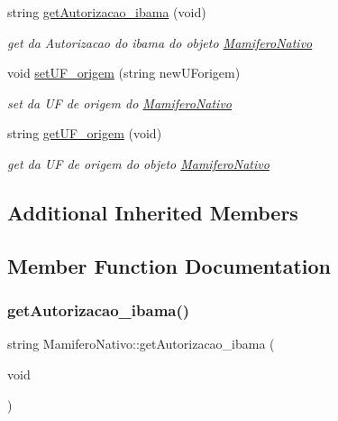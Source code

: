 \begin{DoxyCompactItemize}
string \mbox{\hyperlink{class_mamifero_nativo_a05e4212ad010052b947debc38a989d4e}{get\+Autorizacao\+\_\+ibama}} (void)
\begin{DoxyCompactList}\small\item\em get da Autorizacao do ibama do objeto \mbox{\hyperlink{class_mamifero_nativo}{Mamifero\+Nativo}} \end{DoxyCompactList}\item 
void \mbox{\hyperlink{class_mamifero_nativo_a33dab8f22dca500fa70ac3ed1be287c5}{set\+U\+F\+\_\+origem}} (string new\+U\+Forigem)
\begin{DoxyCompactList}\small\item\em set da UF de origem do \mbox{\hyperlink{class_mamifero_nativo}{Mamifero\+Nativo}} \end{DoxyCompactList}\item 
string \mbox{\hyperlink{class_mamifero_nativo_ac5eccd191e70a72e25cab761a460136a}{get\+U\+F\+\_\+origem}} (void)
\begin{DoxyCompactList}\small\item\em get da UF de origem do objeto \mbox{\hyperlink{class_mamifero_nativo}{Mamifero\+Nativo}} \end{DoxyCompactList}\end{DoxyCompactItemize}
\subsection*{Additional Inherited Members}


\subsection{Member Function Documentation}
\mbox{\label{class_mamifero_nativo_a05e4212ad010052b947debc38a989d4e}} 
\subsubsection{\texorpdfstring{getAutorizacao\_ibama()}{getAutorizacao\_ibama()}}
{\footnotesize\ttfamily string Mamifero\+Nativo\+::get\+Autorizacao\+\_\+ibama (\begin{DoxyParamCaption}\item[{void}]{ }\end{DoxyParamCaption})\hspace{0.3cm}{\ttfamily [virtual]}}



